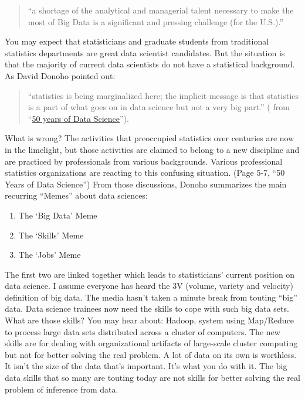 \documentclass[
]{article}
\providecommand{\tightlist}{%
  \setlength{\itemsep}{0pt}\setlength{\parskip}{0pt}}
\begin{document}
\begin{quote}
``a shortage of the analytical and managerial talent necessary to make
the most of Big Data is a significant and pressing challenge (for the
U.S.).''
\end{quote}

You may expect that statisticians and graduate students from traditional
statistics departments are great data scientist candidates. But the
situation is that the majority of current data scientists do not have a
statistical background. As David Donoho pointed out:

\begin{quote}
``statistics is being marginalized here; the implicit message is that
statistics is a part of what goes on in data science but not a very big
part.'' ( from
``\href{http://pages.cs.wisc.edu/~anhai/courses/784-fall15/50YearsDataScience.pdf}{50
years of Data Science}'').
\end{quote}

What is wrong? The activities that preoccupied statistics over centuries
are now in the limelight, but those activities are claimed to belong to
a new discipline and are practiced by professionals from various
backgrounds. Various professional statistics organizations are reacting
to this confusing situation. (Page 5-7, ``50 Years of Data Science'')
From those discussions, Donoho summarizes the main recurring ``Memes''
about data sciences:

\begin{enumerate}
\def\labelenumi{\arabic{enumi}.}
\tightlist
\item
  The `Big Data' Meme
\item
  The `Skills' Meme
\item
  The `Jobs' Meme
\end{enumerate}

The first two are linked together which leads to statisticians' current
position on data science. I assume everyone has heard the 3V (volume,
variety and velocity) definition of big data. The media hasn't taken a
minute break from touting ``big'' data. Data science trainees now need
the skills to cope with such big data sets. What are those skills? You
may hear about: Hadoop, system using Map/Reduce to process large data
sets distributed across a cluster of computers. The new skills are for
dealing with organizational artifacts of large-scale cluster computing
but not for better solving the real problem. A lot of data on its own is
worthless. It isn't the size of the data that's important. It's what you
do with it. The big data skills that so many are touting today are not
skills for better solving the real problem of inference from data.
\end{document}
